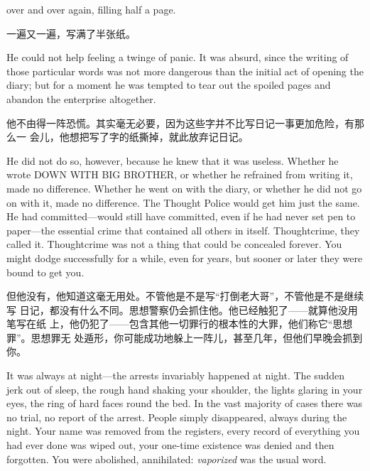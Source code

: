 \begin{paracol}{2}
over and over again, filling half a page.

\switchcolumn

一遍又一遍，写满了半张纸。

\switchcolumn*

He could not help feeling a twinge of panic. It was absurd, since the
writing of those particular words was not more dangerous than the
initial act of opening the diary; but for a moment he was tempted to
tear out the spoiled pages and abandon the enterprise altogether.

\switchcolumn

他不由得一阵恐慌。其实毫无必要，因为这些字并不比写日记一事更加危险，有那么一
会儿，他想把写了字的纸撕掉，就此放弃记日记。

\switchcolumn*

He did not do so, however, because he knew that it was useless. Whether
he wrote DOWN WITH BIG BROTHER, or whether he refrained from writing it,
made no difference. Whether he went on with the diary, or whether he did
not go on with it, made no difference. The Thought Police would get him
just the same. He had committed---would still have committed, even if he
had never set pen to paper---the essential crime that contained all
others in itself. Thoughtcrime, they called it. Thoughtcrime was not a
thing that could be concealed forever. You might dodge successfully for
a while, even for years, but sooner or later they were bound to get you.

\switchcolumn

但他没有，他知道这毫无用处。不管他是不是写``打倒老大哥''，不管他是不是继续写
日记，都没有什么不同。思想警察仍会抓住他。他已经触犯了——就算他没用笔写在纸
上，他仍犯了——包含其他一切罪行的根本性的大罪，他们称它``思想罪''。思想罪无
处遁形，你可能成功地躲上一阵儿，甚至几年，但他们早晚会抓到你。

\switchcolumn*

It was always at night---the arrests invariably happened at night. The
sudden jerk out of sleep, the rough hand shaking your shoulder, the
lights glaring in your eyes, the ring of hard faces round the bed. In
the vast majority of cases there was no trial, no report of the arrest.
People simply disappeared, always during the night. Your name was
removed from the registers, every record of everything you had ever done
was wiped out, your one-time existence was denied and then forgotten.
You were abolished, annihilated: \emph{vaporized} was the usual word.

\switchcolumn


\end{paracol}
